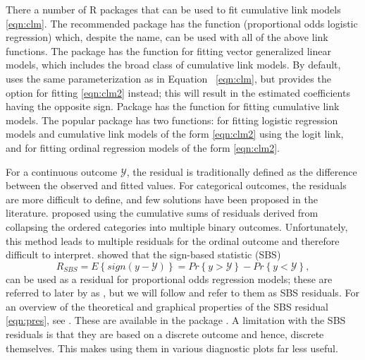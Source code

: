 There a number of R packages that can be used to fit cumulative link models \eqref{eqn:clm}. The recommended package  \citep{pkg-MASS} has the function  (proportional odds logistic regression) which, despite the name, can be used with all of the above link functions. The  package \citep{pkg-VGAM} has the  function for fitting vector generalized linear models, which includes the broad class of cumulative link models. By default,  uses the same parameterization as in Equation~ \eqref{eqn:clm}, but provides the option for fitting \eqref{eqn:clm2} instead; this will result in the estimated coefficients having the opposite sign. Package  \citep{pkg-ordinal} has the  function for fitting cumulative link models. The popular  package \citep{pkg-rms} has two functions:  for fitting logistic regression models and cumulative link models of the form \eqref{eqn:clm2} using the logit link, and  for fitting ordinal regression models of the form \eqref{eqn:clm2}.

For a continuous outcome $\mathcal{Y}$, the residual is traditionally defined as the difference between the observed and fitted values. For categorical outcomes, the residuals are more difficult to define, and few solutions have been proposed in the literature. \citet{graphical-liu-2009} proposed using the cumulative sums of residuals derived from collapsing the ordered categories into multiple binary outcomes. Unfortunately, this method leads to multiple residuals for the ordinal outcome and therefore difficult to interpret. \citet{residuals-li-2012} showed that the sign-based statistic (SBS)
\begin{equation}
\label{eqn:pres}
  R_{SBS} = E\left\{sign\left(y - \mathcal{Y}\right)\right\} = Pr\left\{y > \mathcal{Y}\right\} - Pr\left\{y < \mathcal{Y}\right\},
\end{equation}
can be used as a residual for proportional odds regression models; these are referred to later by \citeauthor{residuals-li-2012} as , but we will follow \citet{residuals-liu-2017} and refer to them as SBS residuals. For an overview of the theoretical and graphical properties of the SBS residual \eqref{eqn:pres}, see \citet{residuals-liu-2017}. These are available in the  package \citep{pkg-PResiduals}. A limitation with the SBS residuals is that they are based on a discrete outcome and hence, discrete themselves. This makes using them in various diagnostic plots far less useful.


